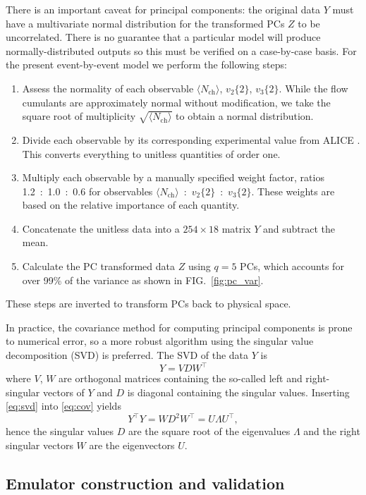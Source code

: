 \documentclass[aps,prc,reprint,superscriptaddress,amsmath]{revtex4-1}
\newcommand{\avg}[1]{\langle #1 \rangle}
\newcommand{\nch}{N_\text{ch}}
\newcommand{\vnk}[2]{v_#1\{#2\}}
\newcommand{\tran}{^\intercal}
\begin{document}
There is an important caveat for principal components:
the original data $Y$ must have a multivariate normal distribution for the transformed PCs $Z$ to be uncorrelated.
There is no guarantee that a particular model will produce normally-distributed outputs so this must be verified on a case-by-case basis.
For the present event-by-event model we perform the following steps:
\begin{enumerate}
  \item Assess the normality of each observable $\avg\nch$, $\vnk 2 2$, $\vnk 3 2$.
    While the flow cumulants are approximately normal without modification, we take the square root of multiplicity $\sqrt{\avg\nch}$ to obtain a normal distribution.
  \item Divide each observable by its corresponding experimental value from ALICE \cite{Abelev:2014mda}.
    This converts everything to unitless quantities of order one.
  \item Multiply each observable by a manually specified weight factor, ratios 1.2~:~1.0~:~0.6 for observables $\avg\nch$~:~$\vnk 2 2$~:~$\vnk 3 2$.
    These weights are based on the relative importance of each quantity.
  \item Concatenate the unitless data into a $254 \times 18$ matrix $Y$ and subtract the mean.
  \item Calculate the PC transformed data $Z$ using $q = 5$ PCs, which accounts for over 99\% of the variance as shown in FIG.~\ref{fig:pc_var}.
\end{enumerate}
These steps are inverted to transform PCs back to physical space.

In practice, the covariance method for computing principal components is prone to numerical error, so a more robust algorithm using the singular value decomposition (SVD) is preferred.
The SVD of the data $Y$ is
\begin{equation}
  Y = VDW\tran
  \label{eq:svd}
\end{equation}
where $V$, $W$ are orthogonal matrices containing the so-called left and right-singular vectors of $Y$ and $D$ is diagonal containing the singular values.
Inserting \eqref{eq:svd} into \eqref{eq:cov} yields
\begin{equation}
  Y\tran Y = W D^2 W\tran = U \Lambda U\tran,
\end{equation}
hence the singular values $D$ are the square root of the eigenvalues $\Lambda$ and the right singular vectors $W$ are the eigenvectors $U$.

\subsection{Emulator construction and validation}
\end{document}
